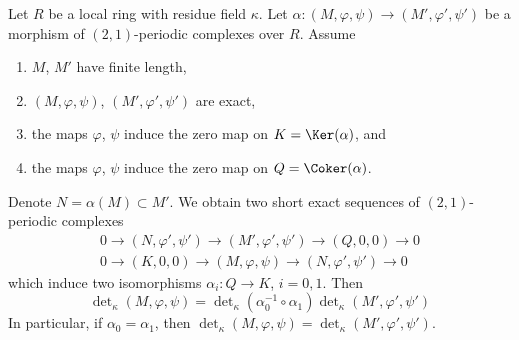 \begin{lemma}
\label{lemma-tricky}
Let $R$ be a local ring with residue field $\kappa$.
Let $\alpha : (M, \varphi, \psi) \to (M', \varphi', \psi')$
be a morphism of $(2, 1)$-periodic complexes over $R$.
Assume
\begin{enumerate}
\item $M$, $M'$ have finite length,
\item $(M, \varphi, \psi)$, $(M', \varphi', \psi')$ are exact,
\item the maps $\varphi$, $\psi$ induce the zero map on
$K = \Ker(\alpha)$, and
\item the maps $\varphi$, $\psi$ induce the zero map on
$Q = \Coker(\alpha)$.
\end{enumerate}
Denote $N = \alpha(M) \subset M'$. We obtain two short exact sequences
of $(2, 1)$-periodic complexes
$$
\begin{matrix}
0 \to (N, \varphi', \psi') \to (M', \varphi', \psi') \to (Q, 0, 0) \to 0 \\
0 \to (K, 0, 0) \to (M, \varphi, \psi) \to (N, \varphi', \psi') \to 0
\end{matrix}
$$
which induce two isomorphisms $\alpha_i : Q \to K$, $i = 0, 1$. Then
$$
\det\nolimits_\kappa(M, \varphi, \psi)
=
\det\nolimits_\kappa(\alpha_0^{-1} \circ \alpha_1)
\det\nolimits_\kappa(M', \varphi', \psi')
$$
In particular, if $\alpha_0 = \alpha_1$, then
$\det\nolimits_\kappa(M, \varphi, \psi) =
\det\nolimits_\kappa(M', \varphi', \psi')$.
\end{lemma}

